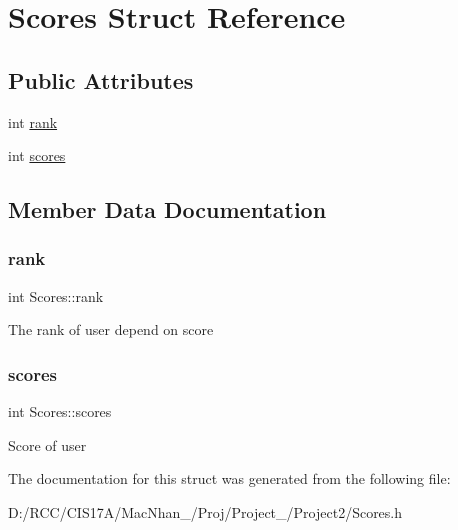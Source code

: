 \hypertarget{struct_scores}{}\section{Scores Struct Reference}
\label{struct_scores}
\subsection*{Public Attributes}
\begin{DoxyCompactItemize}
\item 
int \hyperlink{struct_scores_aab2bf0fee1a8c2b6e85862c526ddbfae}{rank}
\item 
int \hyperlink{struct_scores_adc160fc30f754360378856a273fef5e2}{scores}
\end{DoxyCompactItemize}


\subsection{Member Data Documentation}
\mbox{\label{struct_scores_aab2bf0fee1a8c2b6e85862c526ddbfae}} 
\subsubsection{\texorpdfstring{rank}{rank}}
{\footnotesize\ttfamily int Scores\+::rank}

The rank of user depend on score \mbox{\label{struct_scores_adc160fc30f754360378856a273fef5e2}} 
\subsubsection{\texorpdfstring{scores}{scores}}
{\footnotesize\ttfamily int Scores\+::scores}

Score of user 

The documentation for this struct was generated from the following file\+:\begin{DoxyCompactItemize}
\item 
D\+:/\+R\+C\+C/\+C\+I\+S17\+A/\+Mac\+Nhan\+\_/\+Proj/\+Project\+\_/\+Project2/Scores.\+h\end{DoxyCompactItemize}
